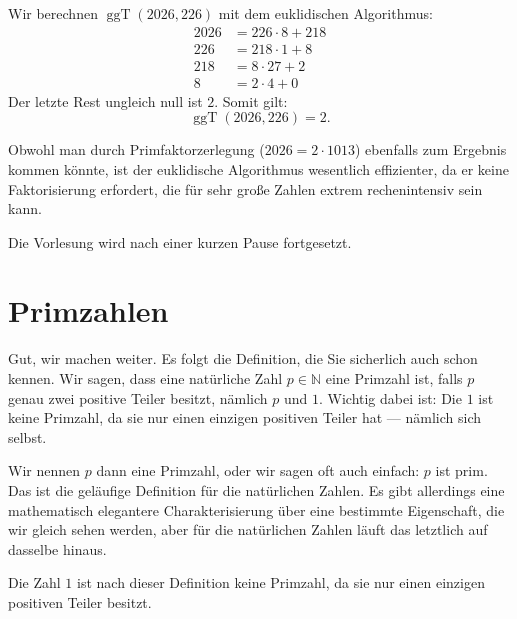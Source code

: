 \begin{math-stroke}
Wir berechnen $\operatorname{ggT}(2026, 226)$ mit dem euklidischen Algorithmus:
\begin{align*}
2026 &= 226 \cdot 8 + 218 \\
226 &= 218 \cdot 1 + 8 \\
218 &= 8 \cdot 27 + 2 \\
8 &= 2 \cdot 4 + 0
\end{align*}
Der letzte Rest ungleich null ist $2$. Somit gilt:
\[
\operatorname{ggT}(2026, 226) = 2.
\]

\begin{explanation-of-steps}
Obwohl man durch Primfaktorzerlegung ($2026 = 2 \cdot 1013$) ebenfalls zum Ergebnis kommen könnte, ist der euklidische Algorithmus wesentlich effizienter, da er keine Faktorisierung erfordert, die für sehr große Zahlen extrem rechenintensiv sein kann.
\end{explanation-of-steps}
\end{math-stroke}

\begin{lecture-break}[Pause]
Die Vorlesung wird nach einer kurzen Pause fortgesetzt.
\end{lecture-break}

\section{Primzahlen}

\begin{spoken-clean}[00:42:54 - 00:44:44]
Gut, wir machen weiter. Es folgt die Definition, die Sie sicherlich auch schon kennen. Wir sagen, dass eine natürliche Zahl $p \in \mathbb{N}$ eine Primzahl ist, falls $p$ genau zwei positive Teiler besitzt, nämlich $p$ und $1$. Wichtig dabei ist: Die $1$ ist keine Primzahl, da sie nur einen einzigen positiven Teiler hat --- nämlich sich selbst.

Wir nennen $p$ dann eine Primzahl, oder wir sagen oft auch einfach: $p$ ist prim. Das ist die geläufige Definition für die natürlichen Zahlen. Es gibt allerdings eine mathematisch elegantere Charakterisierung über eine bestimmte Eigenschaft, die wir gleich sehen werden, aber für die natürlichen Zahlen läuft das letztlich auf dasselbe hinaus.
\end{spoken-clean}

\begin{math-stroke}

\begin{remark}
Die Zahl $1$ ist nach dieser Definition keine Primzahl, da sie nur einen einzigen positiven Teiler besitzt.
\end{remark}
\end{math-stroke}

